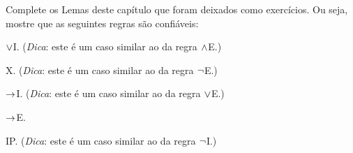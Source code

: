 \practiceproblems

\problempart
\label{pr.Soundness}
Complete os Lemas deste capítulo que foram deixados como exercícios.
Ou seja, mostre que as seguintes regras são confiáveis:
	\begin{earg}
		\item $\vee$I. (\emph{Dica}: este é um caso similar ao da regra $\wedge$E.)
		\item X. (\emph{Dica}: este é um caso similar ao da regra $\neg$E.)
		\item $\rightarrow$I. (\emph{Dica}: este é um caso similar ao da regra $\vee$E.)
		\item $\rightarrow$E.
		\item IP. (\emph{Dica}: este é um caso similar ao da regra $\neg$I.)
	\end{earg}

